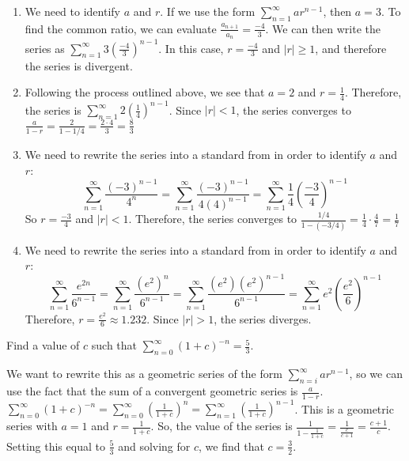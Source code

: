 \begin{Answer}[ref = geo1]
\begin{enumerate}
\item We need to identify $a$ and $r$. If we use the form $\sum_{n=1}^\infty 
ar^{n-1}$, then $a = 3$. To find the common ratio, we can evaluate $\frac{a_
{n+1}}{a_n} = \frac{-4}{3}$. We can then write the series as $\sum_{n=1}^\infty 
3 \left( \frac{-4}{3} \right)^{n-1}$. In this case, $r = \frac{-4}{3}$ and $|r| 
\geq 1$, and therefore the series is divergent. 
\item Following the process outlined above, we see that $a = 2$ and $r = 
\frac{1}{4}$. Therefore, the series is $\sum_{n=1}^\infty 2 \left( \frac{1}{4} 
\right)^{n-1}$. Since $|r| < 1$, the series converges to $\frac{a}{1-r} = 
\frac{2}{1-1/4} = \frac{2 \cdot 4}{3} = \frac{8}{3}$
\item We need to rewrite the series into a standard from in order to identify 
$a$ and $r$:
$$\sum_{n=1}^\infty \frac{(-3)^{n-1}}{4^n} = \sum_{n=1}^\infty \frac{(-3)^
{n-1}}{4(4)^{n-1}} = \sum_{n=1}^\infty \frac{1}{4} \left( \frac{-3}{4} \right)
^{n-1}$$
So $r = \frac{-3}{4}$ and $|r| < 1$. Therefore, the series converges to 
$\frac{1/4}{1 - (-3/4)} = \frac{1}{4} \cdot \frac{4}{7} = \frac{1}{7}$
\item We need to rewrite the series into a standard from in order to identify 
$a$ and $r$:
$$\sum_{n=1}^\infty \frac{e^{2n}}{6^{n-1}} = \sum_{n=1}^\infty \frac{(e^2)^n}
{6^{n-1}} = \sum_{n=1}^\infty \frac{(e^2)(e^2)^{n-1}}{6^{n-1}} = \sum_{n=1}^
\infty e^2 \left( \frac{e^2}{6} \right)^{n-1}$$
Therefore, $r = \frac{e^2}{6} \approx 1.232$. Since $|r| > 1$, the series 
diverges. 
\end{enumerate}
\end{Answer}

\begin{Exercise}[label = geo2]
Find a value of $c$ such that $\sum_{n=0}^\infty (1 + c)^{-n} = \frac{5}{3}$.
\end{Exercise}

\begin{Answer}[ref = geo2]
We want to rewrite this as a geometric series of the form $\sum_{n=i}^\infty 
ar^{n-1}$, so we can use the fact that the sum of a convergent geometric series 
is $\frac{a}{1-r}$. $\sum_{n=0}^\infty (1 + c)^{-n} = \sum_{n=0}^\infty \left( 
\frac{1}{1+c} \right)^n = \sum_{n=1}^\infty \left( \frac{1}{1 + c} \right)^
{n-1}$. This is a geometric series with $a = 1$ and $r = \frac{1}{1 + c}$. So, 
the value of the series is $\frac{1}{1 - \frac{1}{1+c}} = 
\frac{1}{\frac{c}{c+1}} = \frac{c+1}{c}$. Setting this equal to $\frac{5}{3}$ 
and solving for $c$, we find that $c = \frac{3}{2}$.
\end{Answer}

